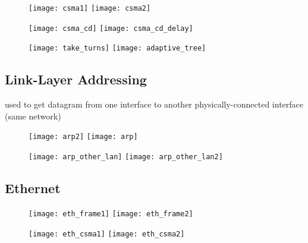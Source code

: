 \begin{figure}[H]
  \centering
  \texttt{[image: csma1]}
  \texttt{[image: csma2]}
\end{figure}

\begin{figure}[H]
  \centering
  \texttt{[image: csma\_cd]}
  \texttt{[image: csma\_cd\_delay]}
\end{figure}

\begin{figure}[H]
  \centering
  \texttt{[image: take\_turns]}
  \texttt{[image: adaptive\_tree]}
\end{figure}

\subsection{Link-Layer Addressing}


 used to get datagram from one interface to
another physically-connected interface (same network)

\begin{figure}[H]
  \centering
  \texttt{[image: arp2]}
  \texttt{[image: arp]}
\end{figure}

\begin{figure}[H]
  \centering
  \texttt{[image: arp\_other\_lan]}
  \texttt{[image: arp\_other\_lan2]}
\end{figure}

\subsection{Ethernet}

\begin{figure}[H]
  \centering
  \texttt{[image: eth\_frame1]}
  \texttt{[image: eth\_frame2]}
\end{figure}

\begin{figure}[H]
  \centering
  \texttt{[image: eth\_csma1]}
  \texttt{[image: eth\_csma2]}
\end{figure}

